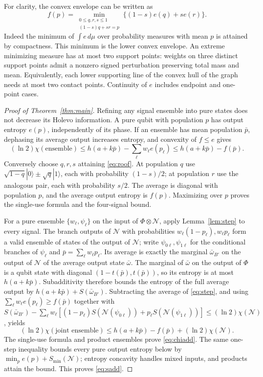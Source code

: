 \documentclass[11pt]{article}
\newcommand{\Smin}{S_{\min}}
\begin{document}
For clarity, the convex envelope can be written as
\begin{equation}\label{eq:roof}
 f(p)=\min_{\substack{0\le q,r,s\le1\\(1-s)q+sr=p}}
       \{(1-s)e(q)+se(r)\}.
\end{equation}
Indeed the minimum of $\int e\,d\mu$ over probability measures with mean $p$ is attained by compactness. This minimum is the lower convex envelope. An extreme minimizing measure has at most two support points: weights on three distinct support points admit a nonzero signed perturbation preserving total mass and mean. Equivalently, each lower supporting line of the convex hull of the graph needs at most two contact points. Continuity of $e$ includes endpoint and one-point cases.

\begin{proof}[Proof of Theorem~\ref{thm:main}]
Refining any signal ensemble into pure states does not decrease its Holevo information. A pure qubit with population $p$ has output entropy $e(p)$, independently of its phase. If an ensemble has mean population $\bar p$, dephasing its average output increases entropy, and convexity of $f\le e$ gives
\[
 (\ln2)\chi(\text{ensemble})
 \le h(a+k\bar p)-\sum_\ell w_\ell e(p_\ell)
 \le h(a+k\bar p)-f(\bar p).
\]
Conversely choose $q,r,s$ attaining \eqref{eq:roof}. At population $q$ use
$\sqrt{1-q}|0\rangle\pm\sqrt q|1\rangle$, each with probability $(1-s)/2$; at population $r$ use the analogous pair, each with probability $s/2$. The average is diagonal with population $p$, and the average output entropy is $f(p)$. Maximizing over $p$ proves the single-use formula and the four-signal bound.

For a pure ensemble $\{w_\ell,\psi_\ell\}$ on the input of $\Phi\otimes\mathcal N$, apply Lemma~\ref{lem:step} to every signal. The branch outputs of $\mathcal N$ with probabilities
$w_\ell(1-p_\ell),w_\ell p_\ell$ form a valid ensemble of states of the output of $\mathcal N$; write $\psi_{0\ell},\psi_{1\ell}$ for the conditional branches of $\psi_\ell$ and $\bar p=\sum_\ell w_\ell p_\ell$. Its average is exactly the marginal $\bar\omega_{B'}$ on the output of $\mathcal N$ of the average output state $\bar\omega$. The marginal of $\bar\omega$ on the output of $\Phi$ is a qubit state with diagonal $(1-t(\bar p),t(\bar p))$, so its entropy is at most $h(a+k\bar p)$. Subadditivity therefore bounds the entropy of the full average output by
$h(a+k\bar p)+S(\bar\omega_{B'})$. Subtracting the average of \eqref{eq:step}, and using
$\sum_\ell w_\ell e(p_\ell)\ge f(\bar p)$ together with
$S(\bar\omega_{B'})-\sum_\ell w_\ell[(1-p_\ell)S(\mathcal N(\psi_{0\ell}))+p_\ell S(\mathcal N(\psi_{1\ell}))]\le(\ln2)\chi(\mathcal N)$, yields
\[
 (\ln2)\chi(\text{joint ensemble})
 \le h(a+k\bar p)-f(\bar p)+(\ln2)\chi(\mathcal N).
\]
The single-use formula and product ensembles prove \eqref{eq:chiadd}. The same one-step inequality bounds every pure output entropy below by
$\min_p e(p)+\Smin(\mathcal N)$; entropy concavity handles mixed inputs, and products attain the bound. This proves \eqref{eq:sadd}.


\end{proof}
\end{document}
